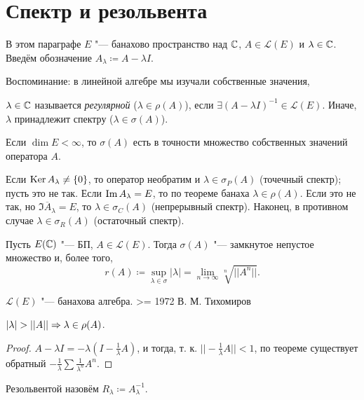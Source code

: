 \documentclass[main]{subfiles}
\begin{document}
\section{Спектр и резольвента}
В этом параграфе $E$ "--- банахово пространство над $\mathbb{C}$,
$A \in \mathcal{L}(E)$ и $\lambda \in \mathbb{C}$.
Введём обозначение $A_\lambda \coloneqq A - \lambda I$.

Воспоминание: в линейной алгебре мы изучали собственные значения,

\begin{definition}
  $\lambda \in \mathbb{C}$ называется \emph{регулярной}
  ($\lambda \in \rho(A)$), если
  $\exists (A - \lambda I)^{-1} \in \mathcal{L}(E)$.
  Иначе, $\lambda$ принадлежит спектру ($\lambda \in \sigma(A)$).
\end{definition}

\begin{example}
  Если $\dim E < \infty$, то $\sigma(A)$ есть в точности
  множество собственных значений оператора $A$.
\end{example}

Если $\operatorname{Ker} A_\lambda \ne \{ 0 \}$, то оператор необратим
и $\lambda \in \sigma_P(A)$ (точечный спектр); пусть это не так.
Если $\operatorname{Im} A_\lambda = E$, то по теореме банаха $\lambda \in \rho(A)$.
Если это не так, но $\overline{\Im A_\lambda} = E$, то $\lambda \in
\sigma_C(A)$ (непрерывный спектр). Наконец, в противном случае
$\lambda \in \sigma_R(A)$ (остаточный спектр).

\begin{theorem}
  Пусть $E(\mathbb{C})$ "--- БП, $A \in \mathcal{L}(E)$.
  Тогда $\sigma(A)$ "--- замкнутое непустое множество
  и, более того,
  \[
    r(A) \coloneqq \sup_{\lambda \in \sigma} |\lambda| =
    \lim_{n \to \infty} \sqrt[n]{||A^n||}.
  \]
\end{theorem}

$\mathcal{L}(E)$ "--- банахова алгебра.
>= 1972 В. М. Тихомиров

\begin{proposition}
  $|\lambda| > ||A|| \Rightarrow \lambda \in \rho(A)$.
\end{proposition}
\begin{proof}
  $A - \lambda I = - \lambda (I - \frac{1}{\lambda} A)$,
  и тогда, т. к. $||-\frac{1}{\lambda} A|| < 1$,
  по теореме существует обратный $-\frac1\lambda \sum \frac1{\lambda^n} A^n$.
\end{proof}

Резольвентой назовём $R_\lambda \coloneqq A_\lambda^{-1}$.
\end{document}
